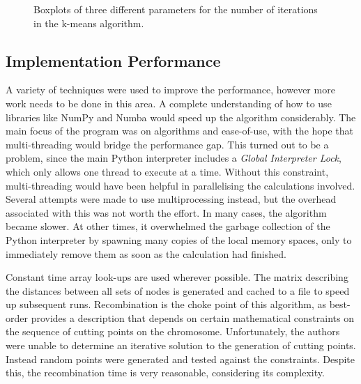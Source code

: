 \documentclass[12pt,twocolumn,oneside]{osajnl}
\begin{document}
\begin{figure}[htbp]
\centering
{}
\caption{Boxplots of three different parameters for the number of iterations in the k-means algorithm.}
\label{fig:kci}
\end{figure}


\subsection{Implementation Performance}
A variety of techniques were used to improve the performance, however more work needs to be done in this area. A complete understanding of how to use libraries like NumPy and Numba would speed up the algorithm considerably. The main focus of the program was on algorithms and ease-of-use, with the hope that multi-threading would bridge the performance gap. This turned out to be a problem, since the main Python interpreter includes a \textit{Global Interpreter Lock}, which only allows one thread to execute at a time. Without this constraint, multi-threading would have been helpful in parallelising the calculations involved. Several attempts were made to use multiprocessing instead, but the overhead associated with this was not worth the effort. In many cases, the algorithm became slower. At other times, it overwhelmed the garbage collection of the Python interpreter by spawning many copies of the local memory spaces, only to immediately remove them as soon as the calculation had finished.

Constant time array look-ups are used wherever possible. The matrix describing the distances between all sets of nodes is generated and cached to a file to speed up subsequent runs. Recombination is the choke point of this algorithm, as best-order provides a description that depends on certain mathematical constraints on the sequence of cutting points on the chromosome. Unfortunately, the authors were unable to determine an iterative solution to the generation of cutting points. Instead random points were generated and tested against the constraints. Despite this, the recombination time is very reasonable, considering its complexity.
\end{document}
